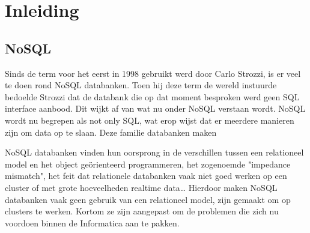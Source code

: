 \chapter{Inleiding}
\label{ch:inleiding}



\section{NoSQL}
Sinds de term voor het eerst in 1998 gebruikt werd door Carlo Strozzi, is er veel te doen rond NoSQL databanken.
Toen hij deze term de wereld instuurde bedoelde Strozzi dat de databank die op dat moment besproken werd geen SQL interface aanbood.
Dit wijkt af van wat nu onder NoSQL verstaan wordt.
NoSQL wordt nu begrepen als not only SQL, wat erop wijst dat er meerdere manieren zijn om data op te slaan.
Deze familie databanken maken 

NoSQL databanken vinden hun oorsprong in de verschillen tussen een relationeel model en het object geörienteerd programmeren, het zogenoemde "impedance mismatch", het feit dat relationele databanken vaak niet goed werken op een cluster of met grote hoeveelheden realtime data\dots
Hierdoor maken NoSQL databanken vaak geen gebruik van een relationeel model, zijn gemaakt om op clusters te werken.
Kortom ze zijn aangepast om de problemen die zich nu voordoen binnen de Informatica aan te pakken. \citep{Sadalage2014OverviewNoSQL}

